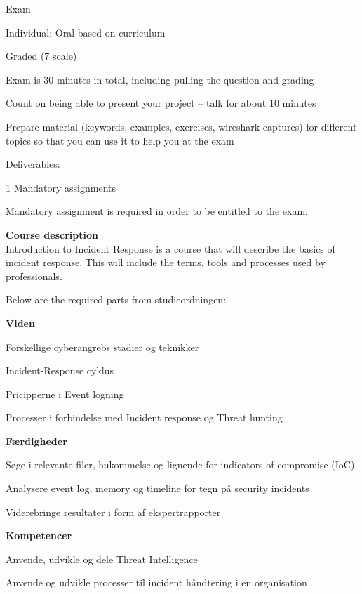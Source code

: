 \documentclass[Screen16to9,17pt]{foils}
\begin{document}
\begin{list2}
\item Exam
\item Individual: Oral based on curriculum
\item Graded (7 scale)
\item Exam is 30 minutes in total, including pulling the question and grading
\item Count on being able to present your project -- talk for about 10 minutes
\item Prepare material (keywords, examples, exercises, wireshark captures) for different topics so that you can use it to help you at the exam

\vskip 5mm
\item Deliverables:
\item 1 Mandatory assignments
\item Mandatory assignment is required in order to be entitled to the exam.
\end{list2}



{\bf Course description}\\
Introduction to Incident Response is a course that will describe the basics of incident response. This will include the terms, tools and processes used by professionals.

Below are the required parts from studieordningen:

{\bf Viden}
\begin{list2}
\item Forskellige cyberangrebs stadier og teknikker
\item Incident-Response cyklus
\item Pricipperne i Event logning
\item Processer i forbindelse med Incident response og Threat hunting
\end{list2}


{\bf Færdigheder}

\begin{list2}
\item Søge i relevante filer, hukommelse og lignende for indicators of compromise (IoC)
\item Analysere event log, memory og timeline for tegn på security incidents
\item Viderebringe resultater i form af ekspertrapporter
\end{list2}

{\bf Kompetencer}
\begin{list2}
\item Anvende, udvikle og dele Threat Intelligence
\item Anvende og udvikle processer til incident håndtering i en organisation
\end{list2}
\end{document}
